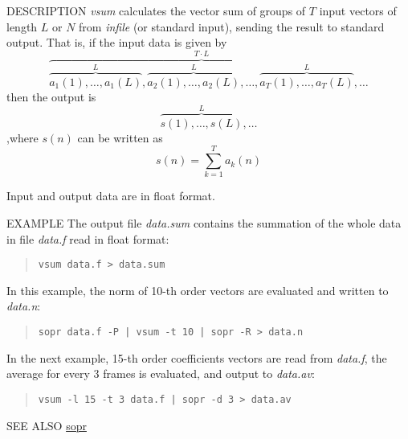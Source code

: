 \begin{synopsis}
\item[vsum] [ --l $L$ ] [ --n $N$ ] [ --t $T$ ] [ {\em infile} ]
\end{synopsis}

\begin{qsection}{DESCRIPTION}
{\em vsum} calculates the vector sum of groups of $T$ input vectors 
of length $L$ or $N$ from {\em infile} (or standard input), 
sending the result to standard output.
That is, if the input data is given by
\begin{displaymath}
\overbrace{
  \overbrace{a_1(1),\dots,a_1(L)}^{L},
  \overbrace{a_2(1),\dots,a_2(L)}^{L},\dots,
  \overbrace{a_T(1),\dots,a_T(L)}^{L}
}^{T \cdot L},\dots
\end{displaymath}
then the output is 
\begin{displaymath}
  \overbrace{s(1),\dots,s(L)}^{L},\dots
\end{displaymath}
,where $s(n)$ can be written as
\begin{displaymath}
  s(n)=\sum_{k=1}^{T} a_k(n)
\end{displaymath}

Input and output data are in float format.
\end{qsection}

\begin{options}
\end{options}

\begin{qsection}{EXAMPLE}
The output file {\em data.sum} contains the summation of
the whole data in file {\em data.f} read in float format:
\begin{quote}
  \verb!vsum data.f > data.sum!
\end{quote}
\par
In this example, the norm of 10-th order vectors are
evaluated and written to {\em data.n}:
\begin{quote}
  \verb!sopr data.f -P | vsum -t 10 | sopr -R > data.n!
\end{quote}
\par
In the next example, 15-th order coefficients vectors are read
from {\em data.f}, the average for every 3 frames is evaluated,
and output to {\em data.av}:
\begin{quote}
  \verb!vsum -l 15 -t 3 data.f | sopr -d 3 > data.av!
\end{quote}
\end{qsection}

\begin{qsection}{SEE ALSO}
\hyperlink{sopr}{sopr}
\end{qsection}
